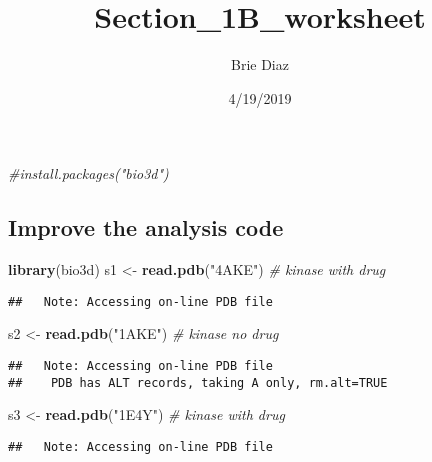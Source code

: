 \documentclass[]{article}
\title{Section\_1B\_worksheet}
\author{Brie Diaz}
\date{4/19/2019}
\newenvironment{Shaded}{\begin{snugshade}}{\end{snugshade}}
\newcommand{\KeywordTok}[1]{\textcolor[rgb]{0.13,0.29,0.53}{\textbf{#1}}}
\newcommand{\StringTok}[1]{\textcolor[rgb]{0.31,0.60,0.02}{#1}}
\newcommand{\CommentTok}[1]{\textcolor[rgb]{0.56,0.35,0.01}{\textit{#1}}}
\newcommand{\NormalTok}[1]{#1}
\begin{document}
\maketitle

\begin{Shaded}
\begin{Highlighting}[]
\CommentTok{#install.packages("bio3d")}
\end{Highlighting}
\end{Shaded}

\subsection{Improve the analysis code}\label{improve-the-analysis-code}

\begin{Shaded}
\begin{Highlighting}[]
\KeywordTok{library}\NormalTok{(bio3d)}
\NormalTok{s1 <-}\StringTok{ }\KeywordTok{read.pdb}\NormalTok{(}\StringTok{"4AKE"}\NormalTok{) }\CommentTok{# kinase with drug}
\end{Highlighting}
\end{Shaded}

\begin{verbatim}
##   Note: Accessing on-line PDB file
\end{verbatim}

\begin{Shaded}
\begin{Highlighting}[]
\NormalTok{s2 <-}\StringTok{ }\KeywordTok{read.pdb}\NormalTok{(}\StringTok{"1AKE"}\NormalTok{) }\CommentTok{# kinase no drug}
\end{Highlighting}
\end{Shaded}

\begin{verbatim}
##   Note: Accessing on-line PDB file
##    PDB has ALT records, taking A only, rm.alt=TRUE
\end{verbatim}

\begin{Shaded}
\begin{Highlighting}[]
\NormalTok{s3 <-}\StringTok{ }\KeywordTok{read.pdb}\NormalTok{(}\StringTok{"1E4Y"}\NormalTok{) }\CommentTok{# kinase with drug}
\end{Highlighting}
\end{Shaded}

\begin{verbatim}
##   Note: Accessing on-line PDB file
\end{verbatim}
\end{document}
